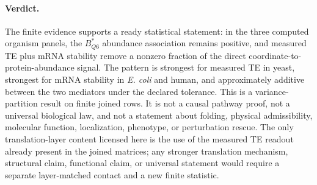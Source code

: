 \paragraph{Verdict.}
The finite evidence supports a ready statistical statement: in the three computed organism panels, the $B^*_{Q6}$ abundance association remains positive, and measured TE plus mRNA stability remove a nonzero fraction of the direct coordinate-to-protein-abundance signal. The pattern is strongest for measured TE in yeast, strongest for mRNA stability in \emph{E. coli} and human, and approximately additive between the two mediators under the declared tolerance. This is a variance-partition result on finite joined rows. It is not a causal pathway proof, not a universal biological law, and not a statement about folding, physical admissibility, molecular function, localization, phenotype, or perturbation rescue. The only translation-layer content licensed here is the use of the measured TE readout already present in the joined matrices; any stronger translation mechanism, structural claim, functional claim, or universal statement would require a separate layer-matched contact and a new finite statistic.